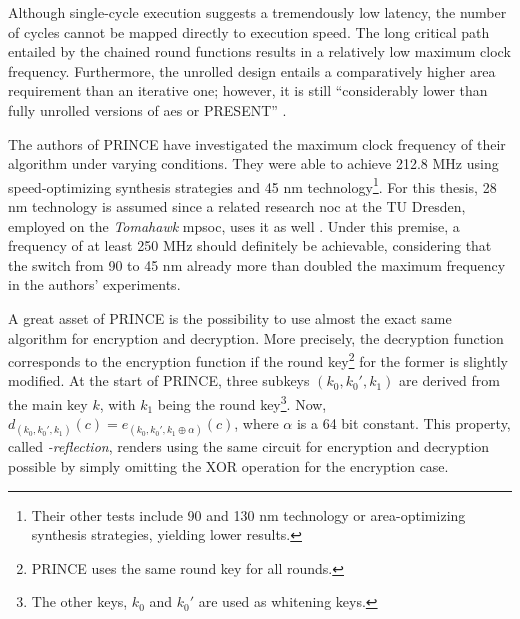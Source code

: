 Although single-cycle execution suggests a tremendously low latency, the number of cycles cannot be mapped directly to execution speed. The long critical path
entailed by the chained round functions results in a relatively low maximum clock frequency. Furthermore, the unrolled design entails a comparatively
higher area requirement than an iterative one; however, it is still \enquote{considerably lower than fully unrolled versions of \gls{aes} or PRESENT}
\cite[3]{borghoff12prince}.

The authors of PRINCE have investigated the maximum clock frequency of their algorithm under varying conditions. They were able to achieve 212.8 MHz
using speed-optimizing synthesis strategies and 45 nm technology\footnote{Their other tests include 90 and 130 nm technology or area-optimizing
synthesis strategies, yielding lower results.}. For this thesis, 28 nm technology is assumed since a related research \gls{noc} at the TU Dresden,
employed on the \textit{Tomahawk} \gls{mpsoc}, uses it as well \cite[35]{cfaedreport}. Under this premise, a frequency of at least 250 MHz should
definitely be achievable, considering that the switch from 90 to 45 nm already more than doubled the maximum frequency in the authors' experiments.

A great asset of PRINCE is the possibility to use almost the exact same algorithm for encryption and decryption. More precisely, the decryption
function corresponds to the encryption function if the round key\footnote{PRINCE uses the same round key for all rounds.} for the former is slightly
modified. At the start of PRINCE, three subkeys $(k_0, k_0', k_1)$ are derived from the main key $k$, with $k_1$ being the round key\footnote{The
other keys, $k_0$ and $k_0'$ are used as whitening keys.}. Now, $d_{(k_0, k_0', k_1)}(c) = e_{(k_0, k_0', k_1 \oplus \alpha)}(c)$, where $\alpha$ is a
64 bit constant. This property, called \textit{\alpha-reflection}, renders using the same circuit for encryption and decryption possible by simply
omitting the XOR operation for the encryption case.

